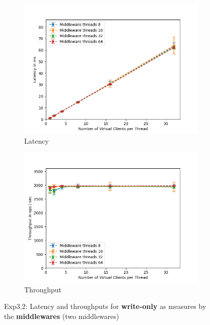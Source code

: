 \documentclass[11pt,a4paper]{article}
\begin{document}
\begin{figure}[H]
\centering
\begin{subfigure}{.5\textwidth}
    \centering
    \includegraphics[width=\textwidth]{img/exp3_2/exp3_2__latency_middleware_write_0.png}
    \caption{Latency}
    \label{fig:mesh1}
\end{subfigure}%
\begin{subfigure}{.5\textwidth}
      \centering
    \includegraphics[width=\textwidth]{img/exp3_2/exp3_2__throughput_middleware_write_0.png}
    \caption{Throughput}
    \label{fig:mesh1}
\end{subfigure}
\caption{Exp3.2: Latency and throughputs for \textbf{write-only} as measures by the \textbf{middlewares} (two middlewares)}
\label{fig:test}
\end{figure}
\end{document}
